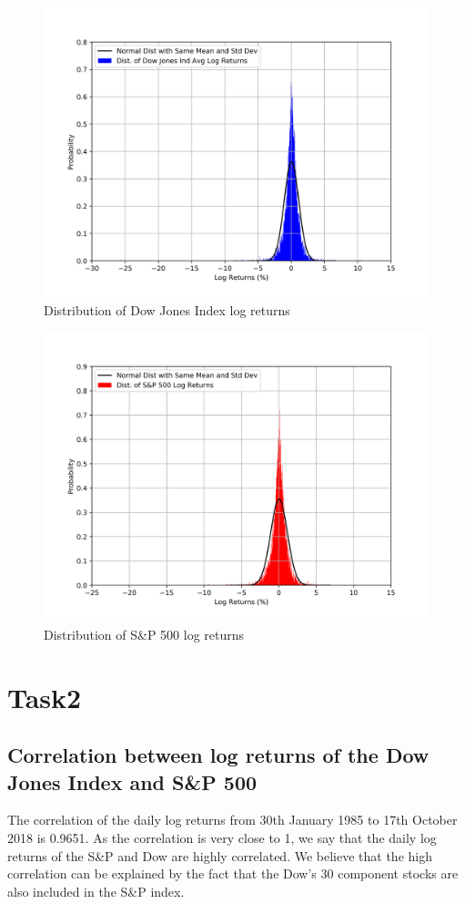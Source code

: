 \documentclass[a4paper]{article}
\begin{document}
\begin{figure}[h!]
	\centering
	\includegraphics[width=0.8\linewidth]{DJInorm.png}
	\caption{Distribution of Dow Jones Index log returns}
\end{figure}
\begin{figure}[h!]
	\centering
	\includegraphics[width=0.8\linewidth]{GSPCnorm.png}
	\caption{Distribution of S\&P 500 log returns}
\end{figure}

\newpage
\section{Task2}
\label{sec:introduction}

\subsection{Correlation between log returns of the Dow Jones Index and S\&P 500}
The correlation of the daily log returns from 30th January 1985 to 17th October 2018 is 0.9651. As the correlation is very close to 1, we say that the daily log returns of the S\&P and Dow are highly correlated. We believe that the high correlation can be explained by the fact that the Dow’s 30 component stocks are also included in the S\&P index. 
\end{document}
